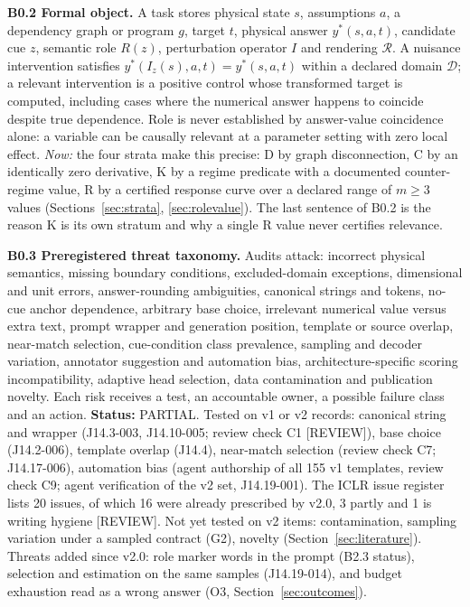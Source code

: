 \documentclass[10pt,a4paper]{article}
\newcommand{\tg}[1]{\textsc{[#1]}}
\begin{document}
\textbf{B0.2 Formal object.} A task stores physical state $s$, assumptions $a$, a dependency graph or program
$g$, target $t$, physical answer $y^*(s,a,t)$, candidate cue $z$, semantic role $R(z)$, perturbation operator
$I$ and rendering $\mathcal{R}$. A nuisance intervention satisfies $y^*(I_z(s),a,t)=y^*(s,a,t)$ within a declared
domain $\mathcal{D}$; a relevant intervention is a positive control whose transformed target is computed,
including cases where the numerical answer happens to coincide despite true dependence. Role is never
established by answer-value coincidence alone: a variable can be causally relevant at a parameter setting with
zero local effect. \emph{Now:} the four strata make this precise: D by graph disconnection, C by an identically
zero derivative, K by a regime predicate with a documented counter-regime value, R by a certified response curve
over a declared range of $m\geq3$ values (Sections~\ref{sec:strata}, \ref{sec:rolevalue}). The last sentence of
B0.2 is the reason K is its own stratum and why a single R value never certifies relevance.

\textbf{B0.3 Preregistered threat taxonomy.} Audits attack: incorrect physical semantics, missing boundary
conditions, excluded-domain exceptions, dimensional and unit errors, answer-rounding ambiguities, canonical
strings and tokens, no-cue anchor dependence, arbitrary base choice, irrelevant numerical value versus extra
text, prompt wrapper and generation position, template or source overlap, near-match selection, cue-condition
class prevalence, sampling and decoder variation, annotator suggestion and automation bias, architecture-specific
scoring incompatibility, adaptive head selection, data contamination and publication novelty. Each risk receives
a test, an accountable owner, a possible failure class and an action.
\textbf{Status:} PARTIAL. Tested on v1 or v2 records: canonical string and wrapper (J14.3-003, J14.10-005;
review check C1 \tg{REVIEW}), base choice (J14.2-006), template overlap (J14.4), near-match selection (review
check C7; J14.17-006), automation bias (agent authorship of all 155 v1 templates, review check C9; agent
verification of the v2 set, J14.19-001). The ICLR issue register lists 20 issues, of which 16 were already
prescribed by v2.0, 3 partly and 1 is writing hygiene \tg{REVIEW}. Not yet tested on v2 items: contamination,
sampling variation under a sampled contract (G2), novelty (Section~\ref{sec:literature}). Threats added since
v2.0: role marker words in the prompt (B2.3 status), selection and estimation on the same samples
(J14.19-014), and budget exhaustion read as a wrong answer (O3, Section~\ref{sec:outcomes}).
\end{document}
